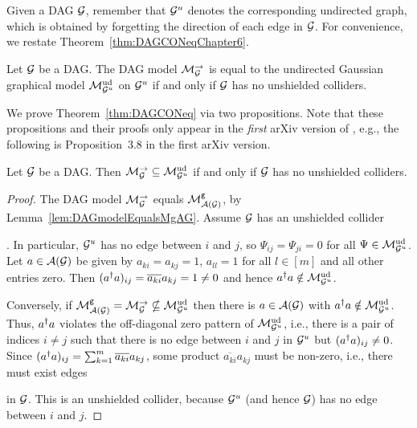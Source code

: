 \medskip

Given a DAG $\mathcal{G}$, remember that $\mathcal{G}^u$ denotes the corresponding undirected graph, which is obtained by forgetting the direction of each edge in $\mathcal{G}$.
For convenience, we restate Theorem~\ref{thm:DAGCONeqChapter6}.

\begin{theorem} 
	\label{thm:DAGCONeq}
	Let $\mathcal{G}$ be a DAG. The DAG model $\mathcal{M}_{\mathcal{G}}^{\to}$ is equal to the undirected Gaussian graphical model $\mathcal{M}^{\mathrm{ud}}_{\mathcal{G}^u}$ on $\mathcal{G}^u$ if and only if $\mathcal{G}$ has no unshielded colliders.
\end{theorem}

We prove Theorem~\ref{thm:DAGCONeq} via two propositions. Note that these propositions and their proofs only appear in the \emph{first} arXiv version of \cite{RDAG}, e.g., the following is Proposition~3.8 in the first arXiv version.

\begin{prop}\label{prop:DAGinCON}
	Let $\mathcal{G}$ be a DAG. Then $\mathcal{M}_{\mathcal{G}}^{\to} \subseteq \mathcal{M}^{\mathrm{ud}}_{\mathcal{G}^u}$ if and only if $\mathcal{G}$ has no unshielded colliders.
\end{prop} 

\begin{proof}
	The DAG model $\mathcal{M}_{\mathcal{G}}^{\to}$ equals $\mathcal{M}^{\mathtt{g}}_{\mathcal{A}(\mathcal{G})}$, by Lemma~\ref{lem:DAGmodelEqualsMgAG}. Assume $\mathcal{G}$ has an unshielded collider . In particular, $\mathcal{G}^u$ has no edge between $i$ and $j$, so $\Psi_{ij} = \Psi_{ji} = 0$ for all $\Psi \in \mathcal{M}^{\mathrm{ud}}_{\mathcal{G}^u}$. Let $a \in \mathcal{A}(\mathcal{G})$ be given by $a_{ki} = a_{kj} = 1$, $a_{ll}  = 1$ for all $l \in [m]$ and all other entries zero. Then $(a^{\dagger} a)_{ij} = \overline{a_{ki}} a_{kj} = 1 \neq 0$ and hence $a^{\dagger} a \notin \mathcal{M}^{\mathrm{ud}}_{\mathcal{G}^u}$.
	
	Conversely, if $\mathcal{M}^{\mathtt{g}}_{\mathcal{A}(\mathcal{G})} = \mathcal{M}_{\mathcal{G}}^{\to} \nsubseteq \mathcal{M}^{\mathrm{ud}}_{\mathcal{G}^u}$ then there is $a \in \mathcal{A}(\mathcal{G})$ with $a^{\dagger} a \notin \mathcal{M}^{\mathrm{ud}}_{\mathcal{G}^u}$. Thus, $a^{\dagger} a$ violates the off-diagonal zero pattern of $\mathcal{M}^{\mathrm{ud}}_{\mathcal{G}^u}$, i.e., there is a pair of indices $i \neq j$ such that there is no edge between $i$ and $j$ in $\mathcal{G}^u$ but $ (a^{\dagger} a)_{ij} \neq 0$. Since $(a^{\dagger} a)_{ij} = \sum_{k=1}^m \overline{a_{ki}} a_{kj}$, some product $\overline{a_{ki}} a_{kj}$ must be non-zero, i.e., there must exist edges  in $\mathcal{G}$. This is an unshielded collider, because $\mathcal{G}^u$ (and hence $\mathcal{G}$) has no edge between $i$ and $j$.
\end{proof} 

